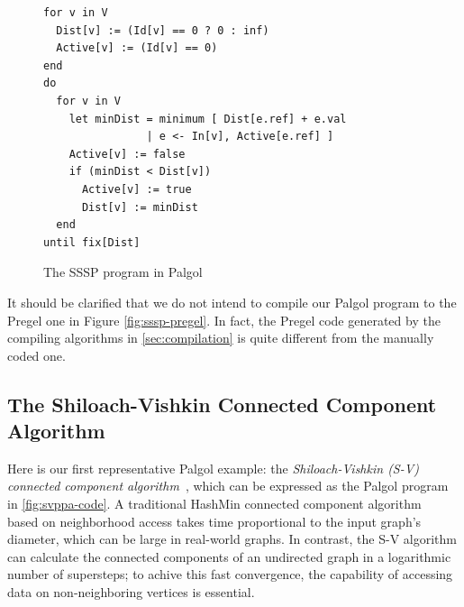\documentclass{sokendai_thesis} %
\begin{document}
\begin{figure}[thp]
\begin{lstlisting}[basicstyle=\small\ttfamily,xleftmargin=0.1\textwidth]
for v in V
  Dist[v] := (Id[v] == 0 ? 0 : inf)
  Active[v] := (Id[v] == 0)
end
do
  for v in V
    let minDist = minimum [ Dist[e.ref] + e.val
                | e <- In[v], Active[e.ref] ]
    Active[v] := false
    if (minDist < Dist[v])
      Active[v] := true
      Dist[v] := minDist
  end
until fix[Dist]
\end{lstlisting}
\vspace{-2ex}
\caption{The SSSP program in Palgol}
\label{fig:sssp-palgol}
\end{figure}


It should be clarified that we do not intend to compile our Palgol program to the Pregel one in Figure \ref{fig:sssp-pregel}.
In fact, the Pregel code generated by the compiling algorithms in \autoref{sec:compilation} is quite different from the manually coded one.

\subsection{The Shiloach-Vishkin Connected Component Algorithm}
\label{sec:sv-algorithm}

Here is our first representative Palgol example: the \emph{Shiloach-Vishkin (S-V) connected component algorithm}~\cite{connectivity}, which can be expressed as the Palgol program in \autoref{fig:svppa-code}.
A traditional HashMin connected component algorithm~\cite{connectivity} based on neighborhood access takes time proportional to the input graph's diameter, which can be large in real-world graphs.
In contrast, the S-V algorithm can calculate the connected components of an undirected graph in a logarithmic number of supersteps; to achive this fast convergence, the capability of accessing data on non-neighboring vertices is essential.
\end{document}
